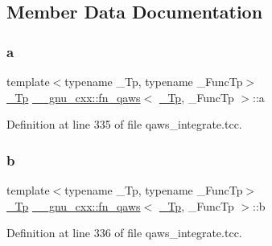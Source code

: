 \subsection{Member Data Documentation}
\mbox{\label{struct____gnu__cxx_1_1fn__qaws_afe83dc1c94299aedf4cb7be0499fe572}} 
\subsubsection{\texorpdfstring{a}{a}}
{\footnotesize\ttfamily template$<$typename \+\_\+\+Tp, typename \+\_\+\+Func\+Tp$>$ \\
\hyperlink{namespace____gnu__cxx_a3b19a9c800ca194374ef9172290f7d79}{\+\_\+\+Tp} \hyperlink{struct____gnu__cxx_1_1fn__qaws}{\+\_\+\+\_\+gnu\+\_\+cxx\+::fn\+\_\+qaws}$<$ \hyperlink{namespace____gnu__cxx_a3b19a9c800ca194374ef9172290f7d79}{\+\_\+\+Tp}, \+\_\+\+Func\+Tp $>$\+::a}



Definition at line 335 of file qaws\+\_\+integrate.\+tcc.

\mbox{\label{struct____gnu__cxx_1_1fn__qaws_a35f509512c31f2ee8fddc16405dc6e80}} 
\subsubsection{\texorpdfstring{b}{b}}
{\footnotesize\ttfamily template$<$typename \+\_\+\+Tp, typename \+\_\+\+Func\+Tp$>$ \\
\hyperlink{namespace____gnu__cxx_a3b19a9c800ca194374ef9172290f7d79}{\+\_\+\+Tp} \hyperlink{struct____gnu__cxx_1_1fn__qaws}{\+\_\+\+\_\+gnu\+\_\+cxx\+::fn\+\_\+qaws}$<$ \hyperlink{namespace____gnu__cxx_a3b19a9c800ca194374ef9172290f7d79}{\+\_\+\+Tp}, \+\_\+\+Func\+Tp $>$\+::b}



Definition at line 336 of file qaws\+\_\+integrate.\+tcc.

\mbox{\label{struct____gnu__cxx_1_1fn__qaws_a0fe42f7ea452aae136c5dba3264c3e93}} 
